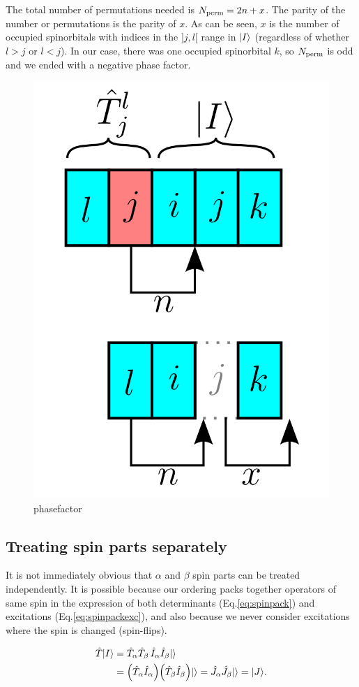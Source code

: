 \documentclass[./thesis.tex]{subfiles}
\begin{document}
The total number of permutations needed is ${N_\text{perm}} = 2n+x$. The parity of the number or permutations is the parity of $x$. As can be seen, $x$ is the number of occupied spinorbitals with indices in the $]j, l[$ range in ${\ket{I}}$ (regardless of whether $l>j$ or $l<j$). In our case, there was one occupied spinorbital $k$, so ${N_\text{perm}}$ is odd and we ended with a negative phase factor.

\begin{figure}[h!]
	\begin{center}
		\includegraphics[width=0.3\columnwidth]{figures/determinant_driven/phasefactor}
		\caption{
		\label{phasefactor}%
		\alert{phasefactor}
		}
	\end{center}
\end{figure}

\subsection{Treating spin parts separately}

It is not immediately obvious that $\alpha$ and $\beta$ spin parts can be treated independently. It is possible because our ordering packs together operators of same spin in the expression of both determinants (Eq.\eqref{eq:spinpack}) and excitations (Eq.\eqref{eq:spinpackexc}), and 
also because we never consider excitations where the spin is changed (spin-flips).

\begin{align}
\label{eq:spin1}
\hat{T} {\ket{I}} & = \hat{T}_\alpha \hat{T}_\beta \,  \hat{I}_\alpha \hat{I}_\beta {\ket{}} \\
\label{eq:spin2}
            & =  \qty(\hat{T}_\alpha \hat{I}_\alpha) \qty(\hat{T}_\beta  \hat{I}_\beta) {\ket{}} 
              = \hat{J}_\alpha \hat{J}_\beta  {\ket{}} = {\ket{J}}.
\end{align}
\end{document}
